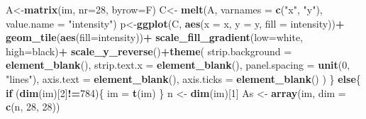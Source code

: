 \documentclass[
]{book}
\newenvironment{Shaded}{\begin{snugshade}}{\end{snugshade}}
\newcommand{\AttributeTok}[1]{\textcolor[rgb]{0.13,0.29,0.53}{#1}}
\newcommand{\ControlFlowTok}[1]{\textcolor[rgb]{0.13,0.29,0.53}{\textbf{#1}}}
\newcommand{\DecValTok}[1]{\textcolor[rgb]{0.00,0.00,0.81}{#1}}
\newcommand{\FunctionTok}[1]{\textcolor[rgb]{0.13,0.29,0.53}{\textbf{#1}}}
\newcommand{\NormalTok}[1]{#1}
\newcommand{\OtherTok}[1]{\textcolor[rgb]{0.56,0.35,0.01}{#1}}
\newcommand{\SpecialCharTok}[1]{\textcolor[rgb]{0.81,0.36,0.00}{\textbf{#1}}}
\newcommand{\StringTok}[1]{\textcolor[rgb]{0.31,0.60,0.02}{#1}}
\theoremstyle{definition}
\theoremstyle{definition}
\theoremstyle{definition}
\theoremstyle{definition}
\theoremstyle{remark}
\begin{document}
\begin{Shaded}
\begin{Highlighting}[]
\NormalTok{    A}\OtherTok{\textless{}{-}}\FunctionTok{matrix}\NormalTok{(im, }\AttributeTok{nr=}\DecValTok{28}\NormalTok{, }\AttributeTok{byrow=}\NormalTok{F)}
\NormalTok{    C}\OtherTok{\textless{}{-}} \FunctionTok{melt}\NormalTok{(A, }\AttributeTok{varnames =} \FunctionTok{c}\NormalTok{(}\StringTok{"x"}\NormalTok{, }\StringTok{"y"}\NormalTok{), }
             \AttributeTok{value.name =} \StringTok{"intensity"}\NormalTok{)}
\NormalTok{    p}\OtherTok{\textless{}{-}}\FunctionTok{ggplot}\NormalTok{(C, }\FunctionTok{aes}\NormalTok{(}\AttributeTok{x =}\NormalTok{ x, }\AttributeTok{y =}\NormalTok{ y, }\AttributeTok{fill =}\NormalTok{ intensity))}\SpecialCharTok{+}
      \FunctionTok{geom\_tile}\NormalTok{(}\FunctionTok{aes}\NormalTok{(}\AttributeTok{fill=}\NormalTok{intensity))}\SpecialCharTok{+}
      \FunctionTok{scale\_fill\_gradient}\NormalTok{(}\AttributeTok{low=}\StringTok{\textquotesingle{}white\textquotesingle{}}\NormalTok{, }\AttributeTok{high=}\StringTok{\textquotesingle{}black\textquotesingle{}}\NormalTok{)}\SpecialCharTok{+}
      \FunctionTok{scale\_y\_reverse}\NormalTok{()}\SpecialCharTok{+}\FunctionTok{theme}\NormalTok{(}
        \AttributeTok{strip.background =} \FunctionTok{element\_blank}\NormalTok{(),}
        \AttributeTok{strip.text.x =} \FunctionTok{element\_blank}\NormalTok{(),}
        \AttributeTok{panel.spacing =} \FunctionTok{unit}\NormalTok{(}\DecValTok{0}\NormalTok{, }\StringTok{"lines"}\NormalTok{),}
        \AttributeTok{axis.text =} \FunctionTok{element\_blank}\NormalTok{(),}
        \AttributeTok{axis.ticks =} \FunctionTok{element\_blank}\NormalTok{()}
\NormalTok{      ) }
\NormalTok{  \}}
  \ControlFlowTok{else}\NormalTok{\{}
    \ControlFlowTok{if}\NormalTok{ (}\FunctionTok{dim}\NormalTok{(im)[}\DecValTok{2}\NormalTok{]}\SpecialCharTok{!=}\DecValTok{784}\NormalTok{)\{}
\NormalTok{      im }\OtherTok{=} \FunctionTok{t}\NormalTok{(im)}
\NormalTok{    \} }
\NormalTok{    n }\OtherTok{\textless{}{-}} \FunctionTok{dim}\NormalTok{(im)[}\DecValTok{1}\NormalTok{]}
\NormalTok{    As }\OtherTok{\textless{}{-}} \FunctionTok{array}\NormalTok{(im, }\AttributeTok{dim =} \FunctionTok{c}\NormalTok{(n, }\DecValTok{28}\NormalTok{, }\DecValTok{28}\NormalTok{))}
    

\end{Highlighting}
\end{Shaded}
\end{document}
